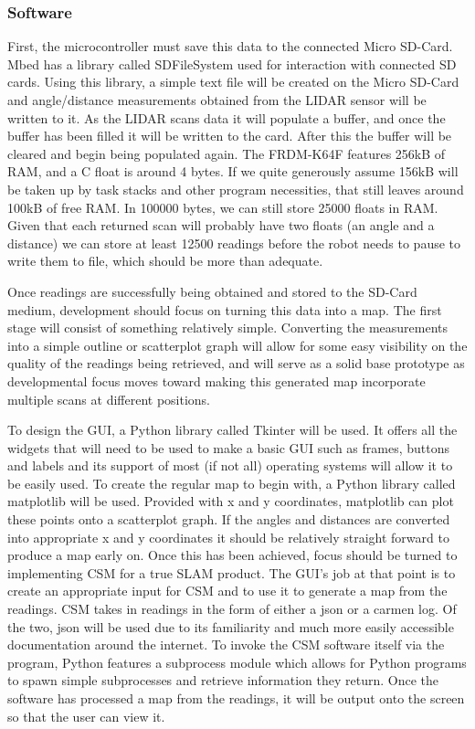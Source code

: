				\subsubsection{Software}
				First, the microcontroller must save this data to the connected Micro SD-Card. Mbed has a library called SDFileSystem used for interaction with connected SD cards. Using this library, a simple text file will be created on the Micro SD-Card and angle/distance measurements obtained from the LIDAR sensor will be written to it. As the LIDAR scans data it will populate a buffer, and once the buffer has been filled it will be written to the card. After this the buffer will be cleared and begin being populated again. The FRDM-K64F features 256kB of RAM, and a C float is around 4 bytes. If we quite generously assume 156kB will be taken up by task stacks and other program necessities, that still leaves around 100kB of free RAM. In 100000 bytes, we can still store 25000 floats in RAM. Given that each returned scan will probably have two floats (an angle and a distance) we can store at least 12500 readings before the robot needs to pause to write them to file, which should be more than adequate.
				
				Once readings are successfully being obtained and stored to the SD-Card medium, development should focus on turning this data into a map. The first stage will consist of something relatively simple. Converting the measurements into a simple outline or scatterplot graph will allow for some easy visibility on the quality of the readings being retrieved, and will serve as a solid base prototype as developmental focus moves toward making this generated map incorporate multiple scans at different positions. 
				
				To design the GUI, a Python library called Tkinter will be used. It offers all the widgets that will need to be used to make a basic GUI such as frames, buttons and labels and its support of most (if not all) operating systems will allow it to be easily used. To create the regular map to begin with, a Python library called matplotlib will be used. Provided with x and y coordinates, matplotlib can plot these points onto a scatterplot graph. If the angles and distances are converted into appropriate x and y coordinates it should be relatively straight forward to produce a map early on. Once this has been achieved, focus should be turned to implementing CSM for a true SLAM product. The GUI's job at that point is to create an appropriate input for CSM and to use it to generate a map from the readings. CSM takes in readings in the form of either a json or a carmen log. Of the two, json will be used due to its familiarity and much more easily accessible documentation around the internet. To invoke the CSM software itself via the program, Python features a subprocess module which allows for Python programs to spawn simple subprocesses and retrieve information they return. Once the software has processed a map from the readings, it will be output onto the screen so that the user can view it.
		\newpage
		
